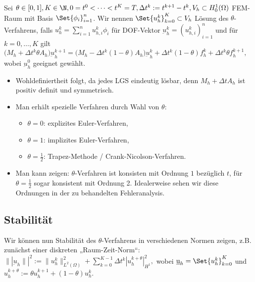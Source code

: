 \begin{df} \label{4.9}
	Sei $\theta \in [0,1], K \in \N, 0 = t^0 < \dotsb < t^K = T, \Delta t^k := t^{k+1} - t^k, V_h \subset H_0^1(\Omega)$ FEM-Raum mit Basis $\Set{\phi_i}_{i=1}^n$.
	Wir nennen $\Set{u_h^k}_{k=0}^K \subset V_h$ Lösung des $\theta$-Verfahrens, falls $u_h^k = \sum_{i=1}^n u_{h,i}^k \phi_i$ für DOF-Vektor $\underbar{u}_h^k = (u_{h,i}^k)_{i=1}^n$ und für $k=0, \dotsc, K$ gilt
	\begin{math}
		\big(M_h + \Delta t^k \theta A_h\big) \underbar{u}_h^{k+1} = \big(M_h - \Delta t^k (1-\theta) A_h ) \underbar{u}_h^k + \Delta t^k (1 - \theta) f_h^k + \Delta t^k \theta f_h^{k+1},
	\end{math}
	wobei $\underbar{u}_h^0$ geeignet gewählt.
	\begin{note}
		\begin{itemize}
			\item
				Wohldefiniertheit folgt, da jedes LGS eindeutig lösbar, denn $M_h + \Delta t A_h$ ist positiv definit und symmetrisch.
			\item
				Man erhält spezielle Verfahren durch Wahl von $\theta$:
				\begin{itemize}
					\item
						$\theta = 0$: explizites Euler-Verfahren,
					\item
						$\theta = 1$: implizites Euler-Verfahren,
					\item
						$\theta = \frac{1}{2}$: Trapez-Methode / Crank-Nicolson-Verfahren.
				\end{itemize}
			\item
				Man kann zeigen: $\theta$-Verfahren ist konsisten mit Ordnung $1$ bezüglich $t$, für $\theta = \frac{1}{2}$ sogar konsistent mit Ordnung 2.
				Idealerweise sehen wir diese Ordnungen in der zu behandelten Fehleranalysis.
		\end{itemize}
	\end{note}
\end{df}

\subsection*{Stabilität}

Wir können nun Stabilität des $\theta$-Verfahrens in verschiedenen Normen zeigen, z.B. zunächst einer diskreten „Raum-Zeit-Norm“:
\begin{math}
	\||\underbar{u}_h\||^2 := \|u_h^k\|_{L^2(\Omega)}^2 + \sum_{k=0}^{K-1} \Delta t^k |u_h^{k+\theta}|_{H^1}^2,
\end{math}
wobei $\underbar{u}_h = \Set{u_h^k}_{k=0}^K$ und $u_h^{k+\theta} := \theta u_h^{k+1} + (1- \theta) u_h^k$.


